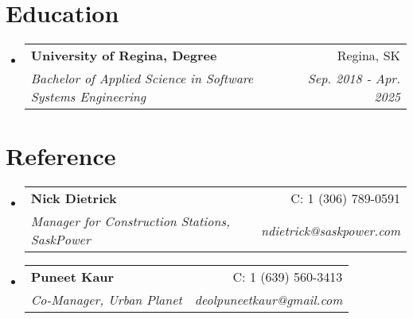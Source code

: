 \documentclass[letterpaper,11pt]{article}
\makeatletter
\newcommand{\resumeSubheading}[4]{
    \vspace{1pt}\item
    \begin{tabular*}{0.97\textwidth}[t]{l@{\extracolsep{\fill}}r}
        \textbf{#1} & #2 \\
        \textit{\small#3} & \textit{\small #4} \\
    \end{tabular*}\vspace{-4pt}
}
\newcommand{\resumeSubHeadingListStart}{\begin{itemize}[leftmargin=0.15in, label={}]}
\newcommand{\resumeSubHeadingListEnd}{\end{itemize}}
\makeatother
\begin{document}
    \section{Education}
        \resumeSubHeadingListStart
            \resumeSubheading
                {University of Regina, Degree}{Regina, SK}
                {Bachelor of Applied Science in Software Systems Engineering}{Sep. 2018 - Apr. 2025}
            \resumeSubHeadingListEnd
        

    \section{Reference}
    \resumeSubHeadingListStart
        \resumeSubheading
            {Nick Dietrick}{C: 1 (306) 789-0591}
            {Manager for Construction Stations, SaskPower}{ndietrick@saskpower.com}
        \resumeSubheading
            {Puneet Kaur}{C: 1 (639) 560-3413}
            {Co-Manager, Urban Planet}{deolpuneetkaur@gmail.com}
    \resumeSubHeadingListEnd

\end{document}
